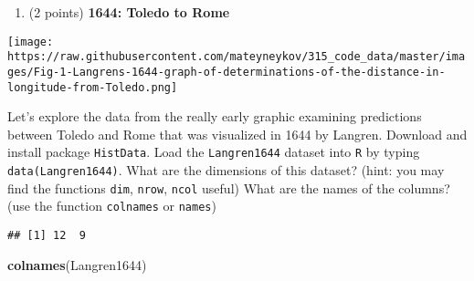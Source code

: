 \documentclass[]{article}
\newenvironment{Shaded}{\begin{snugshade}}{\end{snugshade}}
\newcommand{\CommentTok}[1]{\textcolor[rgb]{0.56,0.35,0.01}{\textit{#1}}}
\newcommand{\DataTypeTok}[1]{\textcolor[rgb]{0.13,0.29,0.53}{#1}}
\newcommand{\KeywordTok}[1]{\textcolor[rgb]{0.13,0.29,0.53}{\textbf{#1}}}
\newcommand{\NormalTok}[1]{#1}
\newcommand{\OperatorTok}[1]{\textcolor[rgb]{0.81,0.36,0.00}{\textbf{#1}}}
\newcommand{\StringTok}[1]{\textcolor[rgb]{0.31,0.60,0.02}{#1}}
\providecommand{\tightlist}{%
  \setlength{\itemsep}{0pt}\setlength{\parskip}{0pt}}
\begin{document}
\begin{enumerate}
\def\labelenumi{\alph{enumi}.}
\setcounter{enumi}{3}
\tightlist
\item
  (2 points) \textbf{1644: Toledo to Rome}
\end{enumerate}

\texttt{[image: https://raw.githubusercontent.com/mateyneykov/315\_code\_data/master/images/Fig-1-Langrens-1644-graph-of-determinations-of-the-distance-in-longitude-from-Toledo.png]}

Let's explore the data from the really early graphic examining
predictions between Toledo and Rome that was visualized in 1644 by
Langren. Download and install package \texttt{HistData}. Load the
\texttt{Langren1644} dataset into \texttt{R} by typing
\texttt{data(Langren1644)}. What are the dimensions of this dataset?
(hint: you may find the functions \texttt{dim}, \texttt{nrow},
\texttt{ncol} useful) What are the names of the columns? (use the
function \texttt{colnames} or \texttt{names})

\begin{Shaded}
\end{Shaded}

\begin{verbatim}
## [1] 12  9
\end{verbatim}

\begin{Shaded}
\begin{Highlighting}[]
\KeywordTok{colnames}\NormalTok{(Langren1644)}
\end{Highlighting}
\end{Shaded}
\end{document}
